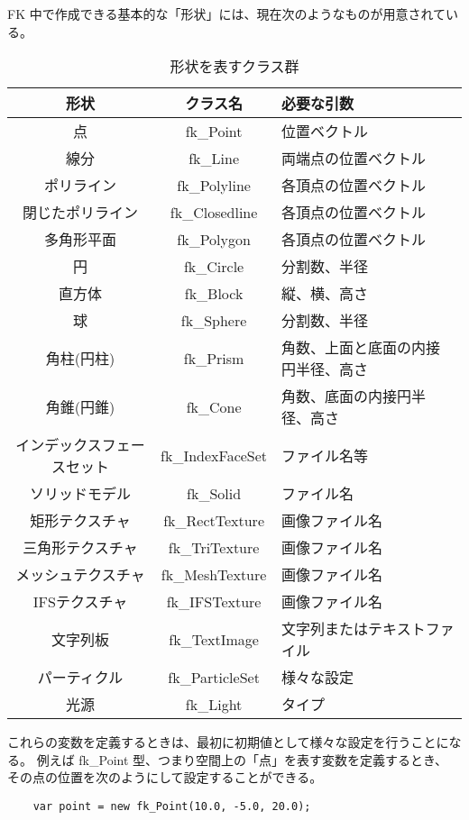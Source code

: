 FK 中で作成できる基本的な「形状」には、現在次のようなものが用意されている。
\begin{table}[H]
\caption{形状を表すクラス群}
\label{tbl:shapeclass}
\begin{small}
\begin{center}
\begin{tabular}{|c|c|l|}
\hline
形状 & クラス名 & 必要な引数 \\ \hline \hline
点 & fk\_Point & 位置ベクトル \\ \hline
線分 & fk\_Line & 両端点の位置ベクトル \\ \hline
ポリライン & fk\_Polyline & 各頂点の位置ベクトル \\ \hline
閉じたポリライン & fk\_Closedline & 各頂点の位置ベクトル \\ \hline
多角形平面 & fk\_Polygon & 各頂点の位置ベクトル \\ \hline
円 & fk\_Circle & 分割数、半径 \\ \hline
直方体 & fk\_Block & 縦、横、高さ \\ \hline
球 & fk\_Sphere & 分割数、半径 \\ \hline
角柱(円柱) & fk\_Prism & 角数、上面と底面の内接円半径、高さ \\ \hline
角錐(円錐) & fk\_Cone & 角数、底面の内接円半径、高さ \\ \hline
インデックスフェースセット & fk\_IndexFaceSet & ファイル名等 \\ \hline
ソリッドモデル & fk\_Solid & ファイル名 \\ \hline
矩形テクスチャ & fk\_RectTexture & 画像ファイル名 \\ \hline
三角形テクスチャ & fk\_TriTexture & 画像ファイル名 \\ \hline
メッシュテクスチャ & fk\_MeshTexture & 画像ファイル名 \\ \hline
IFSテクスチャ & fk\_IFSTexture & 画像ファイル名 \\ \hline
文字列板 & fk\_TextImage & 文字列またはテキストファイル \\ \hline
パーティクル & fk\_ParticleSet & 様々な設定 \\ \hline
光源 & fk\_Light & タイプ \\ \hline
\end{tabular}
\end{center}
\end{small}
\end{table}

これらの変数を定義するときは、最初に初期値として様々な設定を行うことになる。
例えば fk\_Point 型、つまり空間上の「点」を表す変数を定義するとき、
その点の位置を次のようにして設定することができる。
\\
\begin{screen}
\begin{verbatim}
    var point = new fk_Point(10.0, -5.0, 20.0);
\end{verbatim}
\end{screen}
\\

